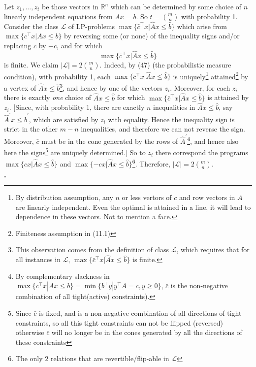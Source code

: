 \documentclass{article}
\newenvironment{proof}{{\it Proof.}}{ \hfill $\square$}
\def\R{{\mathbb R}}
\begin{document}
\begin{proof}
Let $z_1,\dots,z_t$ be those vectors in $\R^n$ which can be determined by some choice of $n$ linearly independent equations from $Ax=b$. So $t=\binom{m}{n}$ with probability 1. Consider the class $\mathcal{L}$ of LP-problems $\max\{\hat{c}^\top x|\hat{A}x\leqslant \hat{b}\}$ which arise from $\max\{c^\top x|Ax\leqslant b\}$ by reversing some (or none) of the inequality signs and/or replacing $c$ by $-c$, and for which
\begin{equation}
\max\{\bar{c}^\top x|\hat{A}x\leqslant \hat{b}\}
\end{equation}
is finite. We claim $\lvert \mathcal{L} \rvert=2\binom{m}{n}$. Indeed, by (47) (the probabilistic measure condition), with probability 1, each $\max\{\bar{c}^\top x|\hat{A}x\leqslant\hat{b}\}$ is uniquely\footnote{By distribution assumption, any $n$ or less vertors of $c$ and row vectors in $A$ are linearly independent. Even the optimal is attained in a line, it will lead to dependence in these vectors. Not to mention a face.} attained\footnote{Finiteness assumption in (11.1)} by a vertex of $\hat{A}x\leqslant \hat{b}$\footnote{This observation comes from the definition of class $\mathcal{L}$, which requires that for all instances in $\mathcal{L}$, $\max\{\bar{c}^\top x|\hat{A}x\leqslant \hat{b}\}$ is finite.}, and hence by one of the vectors $z_i$. Moreover, for each $z_i$ there is exactly \emph{one} choice of $\hat{A}x\leqslant \hat{b}$ for which $\max\{\bar{c}^\top x|\hat{A}x\leqslant \hat{b}\}$ is attained by $z_i$. [Since, with probability 1, there are exactly $n$ inequalities in $\hat{A}x\leqslant \hat{b}$, say $\hat{A}^\prime x\leqslant \hat{b}^\prime$, which are satisfied by $z_i$ with equality. Hence the inequality sign is strict in the other $m-n$ inequalities, and therefore we can not reverse the sign. Moreover, $\bar{c}$ must be in the cone generated by the rows of $\hat{A}^\prime$\footnote{By complementary slackness in $\max\{c^\top x|Ax\leqslant b\}=\min\{b^\top y| y^\top A=c, y\geqslant 0\}$, $\bar{c}$ is the non-negative combination of all tight(active) constraints). }, and hence also here the signs\footnote{Since $\bar{c}$ is fixed, and is a non-negative combination of all directions of tight constraints, so all this tight constraints can not be flipped (reversed) otherwise $\bar{c}$ will no longer be in the cones generated by all the directions of these constraints} are uniquely determined.] So to $z_i$ there correspond the programs $\max\{cx|\hat{A}x\leqslant\hat{b}\}$ and $\max\{-cx|\hat{A}x\leqslant \hat{b}\}$\footnote{The only 2 relations that are revertible/flip-able in $\mathcal{L}$ }. Therefore, $\lvert \mathcal{L}\rvert=2\binom{m}{n}$.


\end{proof}
\end{document}
